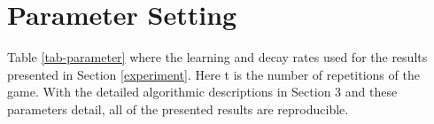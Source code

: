 \documentclass[journal,transmag]{IEEEtran}
\begin{document}

%


\appendices
\section{ Parameter Setting}

Table \ref{tab-parameter} where the learning and decay rates used for the results presented in Section \ref{experiment}. Here t is the number of repetitions of the game. With the detailed algorithmic descriptions in Section 3 and these parameters detail, all of the presented results are reproducible.
\end{document}
